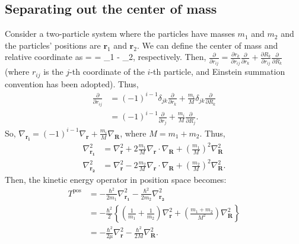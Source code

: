 \subsection{Separating out the center of mass}
Consider a two-particle system where the particles have masses $m_1$ and $m_2$ and the particles' positions are $\bm{r}_1$ and $\bm{r}_2$. We can define the center of mass and relative coordinate as
\bea
	 = \quad {} = _1 - _2,
\eea
respectively. Then, $\frac{\partial}{\partial r_{ij}}=\frac{\partial r_k}{\partial r_{ij}}\frac{\partial}{\partial r_k} + \frac{\partial R_k}{\partial r_{ij}}\frac{\partial}{\partial R_k}$ (where $r_{ij}$ is the $j$-th coordinate of the $i$-th particle, and Einstein summation convention has been adopted). Thus,
\begin{align*}
    \frac{\partial}{\partial r_{ij}} &= (-1)^{i-1}\delta_{jk}\frac{\partial}{\partial r_k} + \frac{m_i}{M}\delta_{jk}\frac{\partial}{\partial R_k}\\
                                     &= (-1)^{i-1}\frac{\partial}{\partial r_j} + \frac{m_i}{M}\frac{\partial}{\partial R_j}.
\end{align*}
So, $\nabla_{\mathbf{r_i}}=(-1)^{i-1}\nabla_{\mathbf{r}} + \frac{m_i}{M}\nabla_{\mathbf{R}}$, where $M=m_1+m_2$. Thus,
\begin{align*}
    \nabla^2_{\mathbf{r_1}}&=\nabla_{\mathbf{r}}^2 + 2\frac{m_1}{M} \nabla_{\mathbf{r}}\cdot\nabla_{\mathbf{R}} + \left(\frac{m_1}{M}\right)^2\nabla^2_{\mathbf{R}}\\
    \nabla^2_{\mathbf{r_2}}&=\nabla_{\mathbf{r}}^2-2\frac{m_2}{M}\nabla_{\mathbf{r}}\cdot\nabla_{\mathbf{R}} + \left(\frac{m_2}{M}\right)^2\nabla^2_{\mathbf{R}}.
\end{align*}
Then, the kinetic energy operator in position space becomes:
\begin{align*}
    T^{\text{pos}} &= -\frac{\hbar^2}{2m_1}\nabla^2_{\mathbf{r_1}} - \frac{\hbar^2}{2m_2}\nabla^2_{\mathbf{r_2}} \\
            &= -\frac{\hbar^2}{2}\left\{ \left(\frac{1}{m_1}+\frac{1}{m_2}\right)\nabla^2_{\mathbf{r}} + \left(\frac{m_1+m_2}{M^2}\right) \nabla_{\mathbf{R}}^2\right\} \\
            &= -\frac{\hbar^2}{2\mu}\nabla_{\mathbf{r}}^2 -\frac{\hbar^2}{2M}\nabla^2_{\mathbf{R}}.\\
\end{align*}
